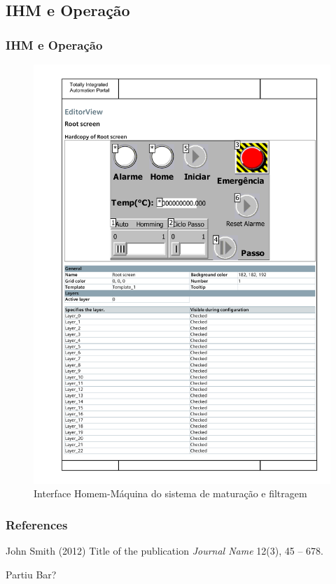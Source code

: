 \documentclass{beamer}
\begin{document}
\subsection{IHM e Operação}
\begin{frame}
	\frametitle{IHM e Operação}
	\begin{figure}[H]
		\centering
		\includegraphics [width=0.6\linewidth]{ihm.pdf}
		\caption {Interface Homem-Máquina do sistema de maturação e filtragem}
		\label{fig:ihm}
	\end{figure}
\end{frame}


\begin{frame}
\frametitle{References}
\footnotesize{
\begin{thebibliography}{99} %
 John Smith (2012)
\newblock Title of the publication
\newblock \emph{Journal Name} 12(3), 45 -- 678.
\end{thebibliography}
}
\end{frame}


\begin{frame}
\Huge{\centerline{Partiu Bar?}}
\end{frame}

\end{document}
